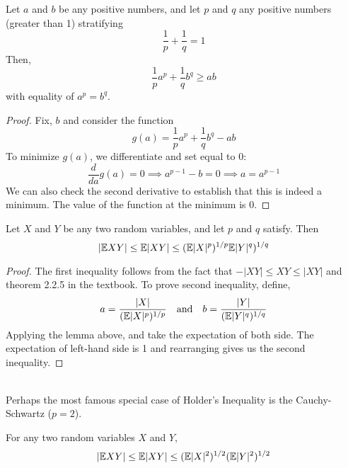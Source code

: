 \begin{lemma}
    Let $a$ and $b$ be any positive numbers, and let $p$ and $q$ any positive numbers (greater than 1) stratifying
    $$
    \frac{1}{p} + \frac{1}{q} = 1
    $$
    Then, 
    $$
    \frac{1}{p} a^p + \frac{1}{q} b^q \geq ab
    $$
    with equality of $a^p = b^q$.
\end{lemma}
\begin{proof}
    Fix, $b$ and consider the function 
    $$
    g(a) = \frac{1}{p} a^p + \frac{1}{q} b^q -ab
    $$
    To minimize $g(a)$, we differentiate and set equal to 0:
    $$
    \frac{d}{da}g(a) = 0 \implies a^{p-1} -b = 0 \implies a = a^{p-1} 
    $$
    We can also check the second derivative to establish that this is indeed a minimum. The value of the function at the minimum is 0. 
\end{proof}
\begin{theorem}
    Let $X$ and $Y$ be any two random variables, and let $p$ and $q$ satisfy. Then
    $$
    |\mathbb E XY| \leq \mathbb E|XY| \leq (\mathbb E |X|^p)^{1/p}\mathbb E |Y|^q)^{1/q}
    $$
\end{theorem}
\begin{proof}
    The first inequality follows from the fact that $-|XY| \leq XY \leq |XY|$ and theorem 2.2.5 in the textbook. To prove second inequality, define,
    $$
    a = \frac{|X|}{(\mathbb E|X|^p)^{1/p}} \quad \text{and} \quad
    b = \frac{|Y|}{(\mathbb E|Y|^q)^{1/q}}
    $$
    Applying the lemma above, and take the expectation of both side. The expectation of left-hand side is 1 and rearranging gives us the second inequality.
\end{proof}
\\
Perhaps the most famous special case of Holder's Inequality is the Cauchy-Schwartz ($p=2$).
\begin{theorem}
    For any two random variables $X$ and $Y$,
    $$|\mathbb E XY| \leq \mathbb E |XY| \leq (\mathbb E|X|^2)^{1/2} (\mathbb E|Y|^2)^{1/2} 
    $$
\end{theorem}